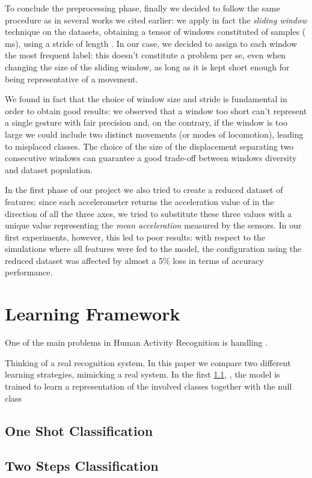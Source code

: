 To conclude the preprocessing phase, finally we decided to follow the same procedure as in several works we cited earlier: we apply in fact the \textit{sliding window} technique on the datasets, obtaining a tensor of windows constituted of  samples ( ms), using a stride of length . In our case, we decided to assign to each window the most frequent label: this doesn't constitute a problem per se, even when changing the size of the sliding window, as long as it is kept short enough for being representative of a movement.

We found in fact that the choice of window size and stride is fundamental in order to obtain good results: we observed that a window too short can't represent a single gesture with fair precision and, on the contrary, if the window is too large we could include two distinct movements (or modes of locomotion), leading to misplaced classes. The choice of the size of the displacement separating two consecutive windows can guarantee a good trade-off between windows diversity and dataset population.

In the first phase of our project we also tried to create a reduced dataset of features: since each accelerometer returns the acceleration value of in the direction of all the three axes, we tried to substitute these three values with a unique value representing the \textit{mean acceleration} measured by the sensors. In our first experiments, however, this led to poor results: with respect to the simulations where all features were fed to the model, the configuration using the reduced dataset was affected by almost a 5\% loss in terms of accuracy performance. 

\section{Learning Framework}
\label{sec:learning_framework}

One of the main problems in Human Activity Recognition is handling .

Thinking of a real recognition system, 
In this paper we compare two different learning strategies, mimicking a real system. In the first \ref{sub:oneshot}, , the model is trained to learn a representation of the involved classes together with the null class

\subsection{One Shot Classification}
\label{sub:oneshot}

\subsection{Two Steps Classification}
\label{sub:twosteps}
